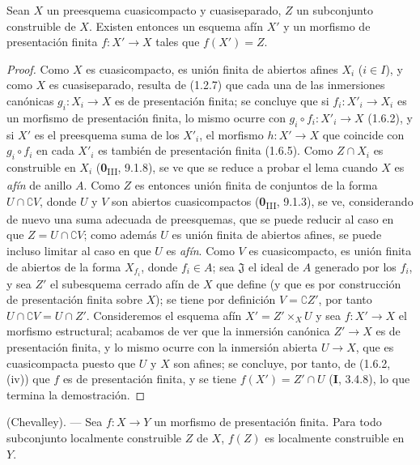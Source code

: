 \begin{lemma}[1.8.3]
\label{IV.1.8.3-fr}
Sean $X$ un preesquema cuasicompacto y cuasiseparado, $Z$ un subconjunto
construible de $X$. Existen entonces un esquema afín $X'$ y un morfismo
de presentación finita $f:X'\to X$ tales que $f(X')=Z$.
\end{lemma}

\begin{proof}
Como $X$ es cuasicompacto, es unión finita de abiertos afines $X_i$
($i\in I$), y como $X$ es cuasiseparado, resulta de (1.2.7) que cada una
de las inmersiones canónicas $g_i:X_i\to X$ es de presentación finita; se
concluye que si $f_i:X'_i\to X_i$ es un morfismo de presentación finita, lo
mismo ocurre con $g_i\circ f_i:X'_i\to X$ (1.6.2), y si $X'$ es el
preesquema suma de los $X'_i$, el morfismo $h:X'\to X$ que coincide con
$g_i\circ f_i$ en cada $X'_i$ es también de presentación finita
(1.6.5). Como $Z\cap X_i$ es construible en $X_i$
(\textbf{0}\textsubscript{III}, 9.1.8), se ve que se reduce a probar el lema
cuando $X$ es \emph{afín} de anillo $A$. Como $Z$ es entonces unión
finita de conjuntos de la forma $U\cap\complement V$, donde $U$ y $V$ son
abiertos cuasicompactos (\textbf{0}\textsubscript{III}, 9.1.3), se ve, considerando
de nuevo una suma adecuada de preesquemas, que se puede reducir al caso en que
$Z=U\cap\complement V$; como además $U$ es unión finita de abiertos
afines, se puede incluso limitar al caso en que $U$ es \emph{afín}. Como $V$
es cuasicompacto, es unión finita de abiertos de la forma $X_{f_i}$, donde
$f_i\in A$; sea $\mathfrak J$ el ideal de $A$ generado por los $f_i$, y
sea $Z'$ el subesquema cerrado afín de $X$ que define (y que es por
construcción de presentación finita sobre $X$); se tiene por definición
$V=\complement Z'$, por tanto $U\cap\complement V=U\cap Z'$. Consideremos el
esquema afín $X'=Z'\times_XU$
y sea $f:X'\to X$ el morfismo estructural; acabamos de ver que
la inmersión canónica $Z'\to X$ es de presentación finita, y lo mismo ocurre
con la inmersión abierta $U\to X$, que es cuasicompacta puesto que $U$ y
$X$ son afines; se concluye, por tanto, de (1.6.2, (iv)) que $f$ es de
presentación finita, y se tiene $f(X')=Z'\cap U$ (\textbf{I}, 3.4.8), lo que termina la
demostración.
\end{proof}

\begin{theorem}[1.8.4]
\label{IV.1.8.4-fr}
\textup{(Chevalley).} --- Sea $f:X\to Y$ un morfismo de presentación
finita. Para todo subconjunto localmente construible $Z$ de $X$, $f(Z)$ es
localmente construible en $Y$.
\end{theorem}

